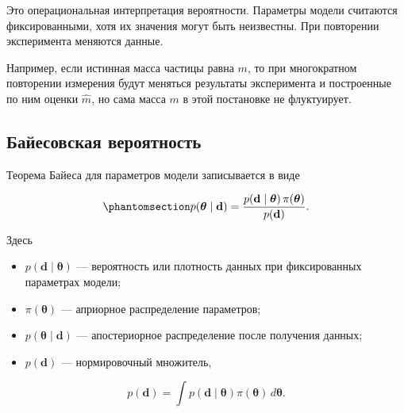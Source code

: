 \documentclass[
  russian,
  11pt,
  a4paper,
  open=any]{scrbook}
\providecommand{\tightlist}{%
  \setlength{\itemsep}{0pt}\setlength{\parskip}{0pt}}
\begin{document}
Это операциональная интерпретация вероятности. Параметры модели
считаются фиксированными, хотя их значения могут быть неизвестны. При
повторении эксперимента меняются данные.

Например, если истинная масса частицы равна \(m\), то при многократном
повторении измерения будут меняться результаты эксперимента и
построенные по ним оценки \(\widehat m\), но сама масса \(m\) в этой
постановке не флуктуирует.

\subsection{Байесовская
вероятность}\label{ux431ux430ux439ux435ux441ux43eux432ux441ux43aux430ux44f-ux432ux435ux440ux43eux44fux442ux43dux43eux441ux442ux44c}

Теорема Байеса для параметров модели записывается в виде

\begin{equation}\protect\phantomsection\label{eq-bayes-theorem}{
p(\boldsymbol{\theta}\mid\mathbf d)
=
\frac{
p(\mathbf d\mid\boldsymbol{\theta})\,
\pi(\boldsymbol{\theta})
}{
p(\mathbf d)
}.
}\end{equation}

Здесь

\begin{itemize}
\tightlist
\item
  \(p(\mathbf d\mid\boldsymbol{\theta})\) --- вероятность или плотность
  данных при фиксированных параметрах модели;
\item
  \(\pi(\boldsymbol{\theta})\) --- априорное распределение параметров;
\item
  \(p(\boldsymbol{\theta}\mid\mathbf d)\) --- апостериорное
  распределение после получения данных;
\item
  \(p(\mathbf d)\) --- нормировочный множитель,
\end{itemize}

\[
p(\mathbf d)
=
\int
p(\mathbf d\mid\boldsymbol{\theta})
\pi(\boldsymbol{\theta})\,d\boldsymbol{\theta}.
\]
\end{document}
